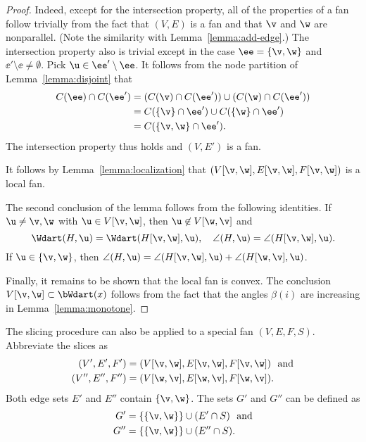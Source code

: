 \begin{proof} 
Indeed, except for the intersection property, all of the properties
of a fan follow trivially from the fact that $(V,E)$ is a fan and
that $\v$ and $\w$ are nonparallel.  (Note the similarity with
Lemma~\ref{lemma:add-edge}.)  The intersection property also is
trivial except in the case $\ee=\{\v,\w\}$ and $\ee'\setminus \ee\ne
\emptyset$.  Pick $\u\in \ee'\setminus\ee$.  It follows from the
node partition of Lemma~\ref{lemma:disjoint} that
\begin{align*}
C(\ee) \cap C(\ee') &= (C(\v) \cap C(\ee')) \cup (C(\w)\cap C(\ee')) \\
&= C(\{\v\}\cap \ee') \cup C(\{\w\}\cap \ee') \\
&= C(\{\v,\w\}\cap \ee').
\end{align*}
The intersection property thus holds and $(V,E')$ is a fan.

It follows by Lemma~\ref{lemma:localization} that
$(V[\v,\w],E[\v,\w],F[\v,\w])$ is a local fan.

The second conclusion of the lemma follows from the following identities.
If $\u\ne \v,\w$ with $\u\in V[\v,\w]$, then $\u\not\in V[\w,\v]$ and 
\begin{equation}
\Wdart(H,\u)=\Wdart(H[\v,\w],\u),\quad \angle(H,\u) = \angle(H[\v,\w],\u).
\end{equation}
If $\u\in\{\v,\w\}$, then 
$\angle(H,\u)=\angle(H[\v,\w],\u) +\angle(H[\w,\v],\u)$.

Finally, it remains to be shown that the local fan is convex.
The conclusion $V[\v,\w]\subset \bWdart(x)$ follows from the
fact that the angles $\beta(i)$ are increasing in
Lemma~\ref{lemma:monotone}.
\end{proof}



The slicing procedure can also be applied to a special fan $(V,E,F,S)$.
Abbreviate the slices as
\begin{align*}
(V',E',F')&=(V[\v,\w],E[\v,\w],F[\v,\w])\text{ \ and}\\
(V'',E'',F'')&= (V[\w,\v],E[\w,\v],F[\w,\v]).
\end{align*}
Both edge sets $E'$ and $E''$ contain $\{\v,\w\}$.  The sets $G'$ and
$G''$ can be defined as
\begin{align*}
G' &= \{\{\v,\w\}\} \cup (E'\cap S)\text{ \ and}\\
G'' &= \{\{\v,\w\}\} \cup (E''\cap S).\\
\end{align*} 

